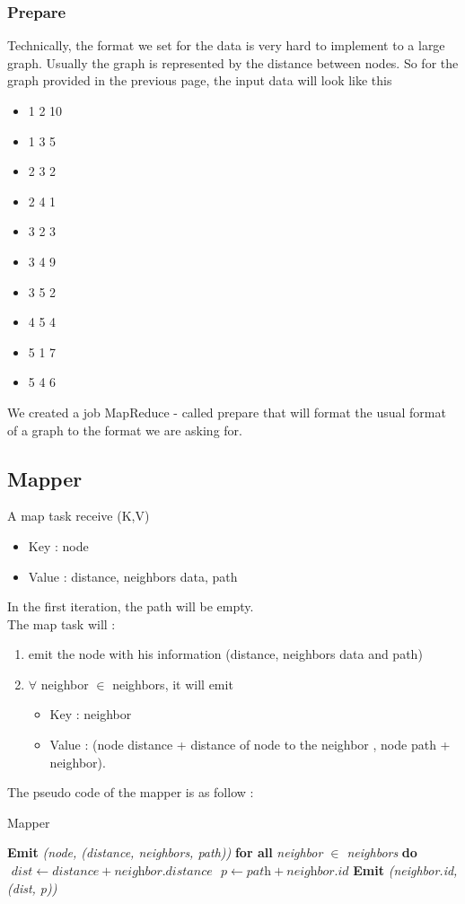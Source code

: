 \documentclass[english]{article}
\begin{document}
\subsubsection{Prepare}
Technically, the format we set for the data is very hard to implement to a large graph. Usually the graph is represented by the distance between nodes. So for the graph provided in the previous page, the input data will look like this 
\begin{itemize}
\item 1 2 10
\item 1 3 5
\item 2 3 2
\item 2 4 1
\item 3 2 3
\item 3 4 9
\item 3 5 2
\item 4 5 4
\item 5 1 7
\item 5 4 6
\end{itemize}
We created a job MapReduce - called prepare that will format the usual format of a graph to the format we are asking for.

\subsection{Mapper}
A map task receive (K,V)
\begin{itemize}
\item Key : node
\item Value : distance, neighbors data, path
\end{itemize}
In the first iteration, the path will be empty. \\
The map task will : 
\begin{enumerate}
\item emit the node with his information (distance, neighbors data and path)
\item  $\forall$ neighbor $\in$ neighbors, it will emit 
	\begin{itemize}
	\item Key : neighbor
	\item Value : (node distance + distance of node to the neighbor , node path + neighbor).
	\end{itemize}
\end{enumerate}

The pseudo code of the mapper is as follow : 
\begin{algorithm}[h]
\caption{Mapper}\label{mapper}
\begin{algorithmic}[1]
\State \textbf{Emit} \emph{(node, (distance, neighbors, path))}
\State \textbf{for all} \emph{ neighbor $ \in$ neighbors } \textbf{do}
\State $\textit{ dist} \gets \textit{distance} + \textit{neighbor.distance} $
\State $ \textit{ p} \gets \textit{path} + \textit{neighbor.id} $
\State \textbf{ Emit} \emph{(neighbor.id, (dist, p))}
\EndProcedure
\end{algorithmic}
\end{algorithm}
\end{document}
